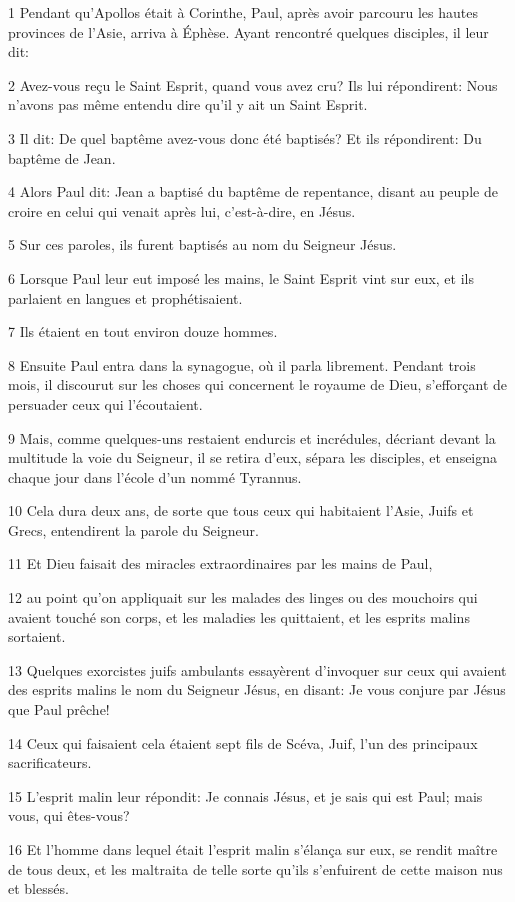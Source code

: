 \par 1 Pendant qu'Apollos était à Corinthe, Paul, après avoir parcouru les hautes provinces de l'Asie, arriva à Éphèse. Ayant rencontré quelques disciples, il leur dit:
\par 2 Avez-vous reçu le Saint Esprit, quand vous avez cru? Ils lui répondirent: Nous n'avons pas même entendu dire qu'il y ait un Saint Esprit.
\par 3 Il dit: De quel baptême avez-vous donc été baptisés? Et ils répondirent: Du baptême de Jean.
\par 4 Alors Paul dit: Jean a baptisé du baptême de repentance, disant au peuple de croire en celui qui venait après lui, c'est-à-dire, en Jésus.
\par 5 Sur ces paroles, ils furent baptisés au nom du Seigneur Jésus.
\par 6 Lorsque Paul leur eut imposé les mains, le Saint Esprit vint sur eux, et ils parlaient en langues et prophétisaient.
\par 7 Ils étaient en tout environ douze hommes.
\par 8 Ensuite Paul entra dans la synagogue, où il parla librement. Pendant trois mois, il discourut sur les choses qui concernent le royaume de Dieu, s'efforçant de persuader ceux qui l'écoutaient.
\par 9 Mais, comme quelques-uns restaient endurcis et incrédules, décriant devant la multitude la voie du Seigneur, il se retira d'eux, sépara les disciples, et enseigna chaque jour dans l'école d'un nommé Tyrannus.
\par 10 Cela dura deux ans, de sorte que tous ceux qui habitaient l'Asie, Juifs et Grecs, entendirent la parole du Seigneur.
\par 11 Et Dieu faisait des miracles extraordinaires par les mains de Paul,
\par 12 au point qu'on appliquait sur les malades des linges ou des mouchoirs qui avaient touché son corps, et les maladies les quittaient, et les esprits malins sortaient.
\par 13 Quelques exorcistes juifs ambulants essayèrent d'invoquer sur ceux qui avaient des esprits malins le nom du Seigneur Jésus, en disant: Je vous conjure par Jésus que Paul prêche!
\par 14 Ceux qui faisaient cela étaient sept fils de Scéva, Juif, l'un des principaux sacrificateurs.
\par 15 L'esprit malin leur répondit: Je connais Jésus, et je sais qui est Paul; mais vous, qui êtes-vous?
\par 16 Et l'homme dans lequel était l'esprit malin s'élança sur eux, se rendit maître de tous deux, et les maltraita de telle sorte qu'ils s'enfuirent de cette maison nus et blessés.
